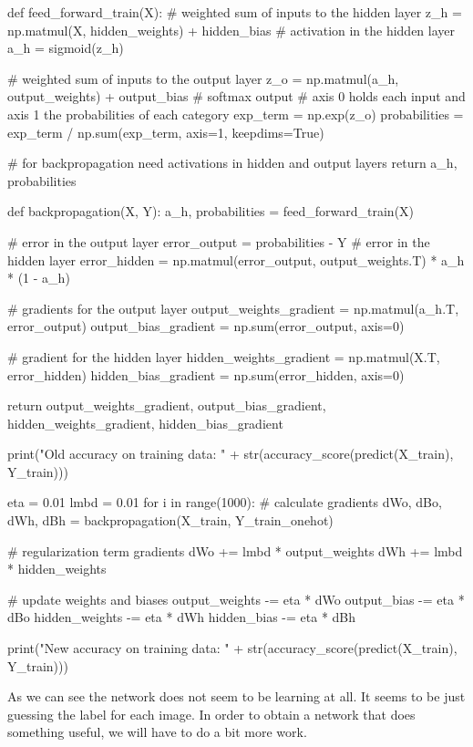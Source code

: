 \documentclass[%
oneside,                 %
final,                   %
10pt]{article}
\begin{document}
def feed_forward_train(X):
    # weighted sum of inputs to the hidden layer
    z_h = np.matmul(X, hidden_weights) + hidden_bias
    # activation in the hidden layer
    a_h = sigmoid(z_h)
    
    # weighted sum of inputs to the output layer
    z_o = np.matmul(a_h, output_weights) + output_bias
    # softmax output
    # axis 0 holds each input and axis 1 the probabilities of each category
    exp_term = np.exp(z_o)
    probabilities = exp_term / np.sum(exp_term, axis=1, keepdims=True)
    
    # for backpropagation need activations in hidden and output layers
    return a_h, probabilities

def backpropagation(X, Y):
    a_h, probabilities = feed_forward_train(X)
    
    # error in the output layer
    error_output = probabilities - Y
    # error in the hidden layer
    error_hidden = np.matmul(error_output, output_weights.T) * a_h * (1 - a_h)
    
    # gradients for the output layer
    output_weights_gradient = np.matmul(a_h.T, error_output)
    output_bias_gradient = np.sum(error_output, axis=0)
    
    # gradient for the hidden layer
    hidden_weights_gradient = np.matmul(X.T, error_hidden)
    hidden_bias_gradient = np.sum(error_hidden, axis=0)

    return output_weights_gradient, output_bias_gradient, hidden_weights_gradient, hidden_bias_gradient

print("Old accuracy on training data: " + str(accuracy_score(predict(X_train), Y_train)))

eta = 0.01
lmbd = 0.01
for i in range(1000):
    # calculate gradients
    dWo, dBo, dWh, dBh = backpropagation(X_train, Y_train_onehot)
    
    # regularization term gradients
    dWo += lmbd * output_weights
    dWh += lmbd * hidden_weights
    
    # update weights and biases
    output_weights -= eta * dWo
    output_bias -= eta * dBo
    hidden_weights -= eta * dWh
    hidden_bias -= eta * dBh

print("New accuracy on training data: " + str(accuracy_score(predict(X_train), Y_train)))
\epycod


As we can see the network does not seem to be learning at all. It seems to be just guessing the label for each image.  
In order to obtain a network that does something useful, we will have to do a bit more work.  
\end{document}
